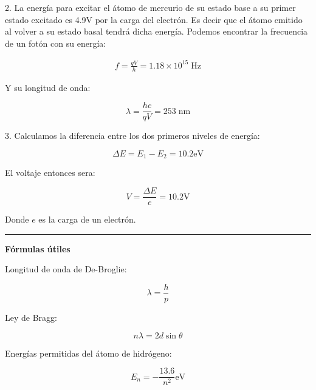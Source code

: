 \documentclass[12pt]{article}
\begin{document}
2. La energía para excitar el átomo de mercurio de su estado base a su primer estado excitado es 4.9V por la carga del electrón. Es decir que el átomo emitido al volver a su estado basal tendrá dicha energía. Podemos encontrar la frecuencia de un fotón con su energía:

\begin{align*}
f = \frac{qV}{h} = 1.18 \times 10^{15} \;\text{Hz}
\end{align*}

Y su longitud de onda:

\begin{equation*}
\lambda = \frac{hc}{qV} = 253 \;\text{nm}
\end{equation*}

3. Calculamos la diferencia entre los dos primeros niveles de energía:

\begin{equation*}
\Delta E = E_1 - E_2 = 10.2 \text{eV}
\end{equation*}

El voltaje entonces sera:

\begin{equation*}
V = \frac{\Delta E}{e} = 10.2 \text{V}
\end{equation*}


Donde $e$ es la carga de un electrón.

\noindent\rule{16.5cm}{0.4pt}








\begin{center}
	\textbf{Fórmulas útiles}
\end{center}

Longitud de onda de De-Broglie:

\begin{equation*}
\lambda = \frac{h}{p}
\end{equation*}

Ley de Bragg:

\begin{equation}
n\lambda = 2 d \sin\theta
\end{equation}

Energías permitidas del átomo de hidrógeno:

\begin{equation*}
E_n = - \frac{13.6}{n^2} \text{eV}
\end{equation*}
\end{document}
